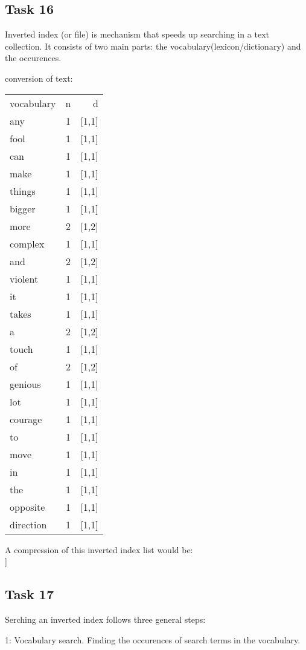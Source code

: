 \documentclass[12pt, a4paper]{article}
\begin{document}
\subsection{Task 16}
Inverted index (or file) is mechanism that speeds up searching in a text collection. 
It consists of two main parts: the vocabulary(lexicon/dictionary) and the occurences.

conversion of text: 
\begin{tabular}{ l c r }
vocabulary 	& n & d \\
any 		& 1 & [1,1]\\
fool 		& 1 & [1,1]\\ 
can 		& 1 & [1,1]\\
make 		& 1 & [1,1]\\
things 		& 1 & [1,1]\\
bigger 		& 1 & [1,1]\\
more 		& 2 & [1,2]\\
complex 	& 1 & [1,1]\\
and 		& 2 & [1,2]\\
violent 	& 1 & [1,1]\\
it 			& 1 & [1,1]\\
takes		& 1 & [1,1]\\
a 			& 2 & [1,2]\\
touch 		& 1 & [1,1]\\
of 			& 2 & [1,2]\\
genious 	& 1 & [1,1]\\
lot 		& 1 & [1,1]\\
courage 	& 1 & [1,1]\\
to 			& 1 & [1,1]\\
move 		& 1 & [1,1]\\
in 			& 1 & [1,1]\\
the 		& 1 & [1,1]\\
opposite 	& 1 & [1,1]\\
direction 	& 1 & [1,1]\\
\end{tabular}

A compression of this inverted index list would be: \\
[1, [1,1,1,1,1,1,2,1,2,1,1,1,2,1,2,1,1,1,1,1,1,1]]

\subsection{Task 17}
Serching an inverted index follows three general steps: 

1: Vocabulary search. Finding the occurences of search terms in the vocabulary. 
\end{document}
